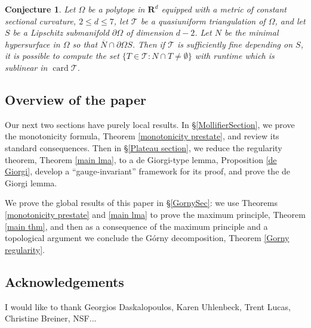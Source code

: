 \documentclass[reqno,10pt]{amsart}
\newcommand{\RR}{\mathbf{R}}
\DeclareMathOperator{\card}{card}
\newtheorem{conjecture}[theorem]{Conjecture}
\theoremstyle{definition}
\numberwithin{equation}{section}
\begin{document}
\begin{conjecture}
Let $\Omega$ be a polytope in $\RR^d$ equipped with a metric of constant sectional curvature, $2 \leq d \leq 7$, let $\mathcal T$ be a quasiuniform triangulation of $\Omega$, and let $S$ be a Lipschitz submanifold $\partial \Omega$ of dimension $d - 2$.
Let $N$ be the minimal hypersurface in $\Omega$ so that $\overline N \cap \partial \Omega S$.
Then if $\mathcal T$ is sufficiently fine depending on $S$, it is possible to compute the set $\{T \in \mathcal T: N \cap T \neq \emptyset\}$ with runtime which is sublinear in $\card \mathcal T$.
\end{conjecture}


\subsection{Overview of the paper}

Our next two sections have purely local results.
In \S\ref{MollifierSection}, we prove the monotonicity formula, Theorem \ref{monotonicity prestate}, and review its standard consequences.
Then in \S\ref{Plateau section}, we reduce the regularity theorem, Theorem \ref{main lma}, to a de Giorgi-type lemma, Proposition \ref{de Giorgi}, develop a ``gauge-invariant'' framework for its proof, and prove the de Giorgi lemma.

We prove the global results of this paper in \S\ref{GornySec}: we use Theorems \ref{monotonicity prestate} and \ref{main lma} to prove the maximum principle, Theorem \ref{main thm}, and then as a consequence of the maximum principle and a topological argument we conclude the G\'orny decomposition, Theorem \ref{Gorny regularity}.


\subsection{Acknowledgements}
I would like to thank Georgios Daskalopoulos, Karen Uhlenbeck, Trent Lucas, Christine Breiner, NSF...




\end{document}
